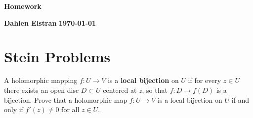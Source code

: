 \documentclass[12pt]{article}
\begin{document}
\begin{newtitle}
  \begin{center}
    \textbf{\Huge Homework}
  \end{center}
  \textbf{Dahlen Elstran} \hfill \textbf{\today}
\end{newtitle}

\section{Stein Problems}

\begin{statement}[8.5.1]
  A holomorphic mapping $f: U \to V$ is a \textbf{local bijection} on $U$ if for every $z \in U$ there exists an 
  open disc $D \subset U$ centered at $z$, so that $f: D \to f(D)$ is a bijection. Prove that a holomorphic 
  map $f:U \to V$ is a local bijection on $U$ if and only if $f'(z) \neq 0$ for all $z \in U$. 
\end{statement}
\end{document}
